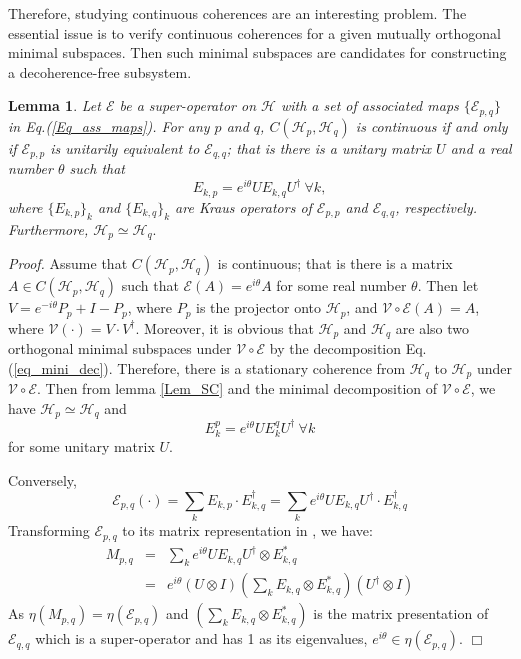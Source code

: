 \documentclass[journal]{IEEEtran}
\def\h{\ensuremath{\mathcal{H}}}
\def\v{\ensuremath{\mathcal{V}}}
\def\e{\ensuremath{\mathcal{E}}}
\newtheorem{lemma}{Lemma}
\begin{document}
Therefore, studying continuous coherences are an interesting problem. The essential issue is to verify continuous coherences for a given mutually orthogonal minimal subspaces. Then such minimal subspaces are candidates for constructing a decoherence-free subsystem.
\begin{lemma}\label{lem_block_eq}
  Let $\e$ be a super-operator on $\h$ with a set of associated maps $\{\e_{p,q}\}$ in Eq.(\ref{Eq_ass_maps}). For any $p$ and $q$,  $C(\h_p,\h_q)$ is continuous if and only if $\e_{p,p}$ is unitarily equivalent to $\e_{q,q}$; that is there is a unitary matrix $U$ and a real number $\theta$ such that 
  $$E_{k,p}=e^{i\theta}UE_{k,q}U^\dagger \ \forall k,$$  where $\{E_{k,p}\}_k$ and $\{E_{k,q}\}_k$ are Kraus operators of $\e_{p,p}$ and $\e_{q,q}$, respectively.  Furthermore, $\h_p\simeq\h_q.$
\end{lemma}
{\it Proof.} 
Assume that $C(\h_p,\h_q)$ is continuous; that is  there is a matrix $A\in C(\h_p,\h_q)$ such that $\e(A)=e^{i\theta}A$ for some real number $\theta$. Then let $V=e^{-i\theta}P_p+I-P_p$, where $P_p$ is the projector onto $\h_p$,  and  $\v\circ\e(A)=A$, where $\v(\cdot)=V\cdot V^\dagger$. Moreover, it is obvious that $\h_p$ and $\h_q$ are also two orthogonal minimal subspaces under $\v\circ\e$  by the decomposition Eq.(\ref{eq_mini_dec}). Therefore, there is a stationary coherence from $\h_q$ to $\h_p$ under $\v\circ\e.$ Then from lemma \ref{Lem_SC} and the minimal decomposition of $\v\circ\e$, we have $\h_p\simeq\h_q$ and 
$$E_k^p=e^{i\theta }UE_k^qU^\dagger \ \forall k$$ for some unitary matrix $U$.

Conversely, $$\e_{p,q}(\cdot)=\sum_{k}E_{k,p}\cdot E_{k,q}^\dagger=\sum_{k}e^{i\theta}UE_{k,q}U^\dagger\cdot E_{k,q}^\dagger$$ 
Transforming $\e_{p,q}$ to its matrix representation in \cite{guan2016decomposition}, we have:
\begin{eqnarray*}
  M_{p,q}&=&\sum_k e^{i\theta}UE_{k,q}U^\dagger\otimes E_{k,q}^{*}\\
  &=&e^{i\theta}(U\otimes I)(\sum_k E_{k,q}\otimes E_{k,q}^{*})(U^\dagger\otimes I)
\end{eqnarray*}
As $\eta(M_{p,q})=\eta(\e_{p,q})$ and $(\sum_k E_{k,q}\otimes E_{k,q}^{*})$ is the matrix presentation of $\e_{q,q}$ which is a super-operator and has 1 as its eigenvalues, $e^{i\theta}\in\eta(\e_{p,q}).$  
\hfill $\Box$
\end{document}
